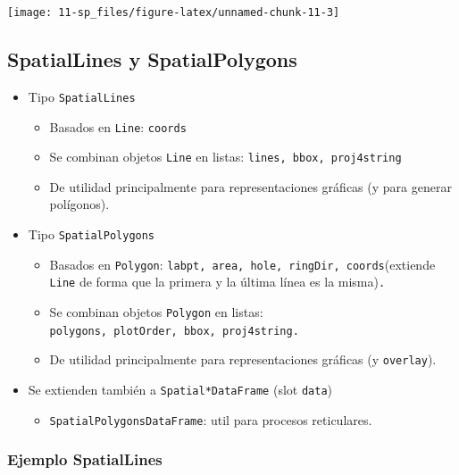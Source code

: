 \documentclass[
  spanish,
]{book}
\providecommand{\tightlist}{%
  \setlength{\itemsep}{0pt}\setlength{\parskip}{0pt}}
\theoremstyle{break}
\begin{document}
\begin{center}\texttt{[image: 11-sp\_files/figure-latex/unnamed-chunk-11-3]} \end{center}

\hypertarget{spatiallines-y-spatialpolygons}{%
\subsection{SpatialLines y SpatialPolygons}\label{spatiallines-y-spatialpolygons}}

\begin{itemize}
\item
  Tipo \texttt{SpatialLines}

  \begin{itemize}
  \item
    Basados en \texttt{Line}: \texttt{coords}
  \item
    Se combinan objetos \texttt{Line} en listas: \texttt{lines,\ bbox,\ proj4string}
  \item
    De utilidad principalmente para representaciones gráficas (y
    para generar polígonos).
  \end{itemize}
\item
  Tipo \texttt{SpatialPolygons}

  \begin{itemize}
  \item
    Basados en \texttt{Polygon}:
    \texttt{labpt,\ area,\ hole,\ ringDir,\ coords}(extiende \texttt{Line} de forma
    que la primera y la última línea es la misma)\texttt{.}
  \item
    Se combinan objetos \texttt{Polygon} en listas:
    \texttt{polygons,\ plotOrder,\ bbox,\ proj4string.}
  \item
    De utilidad principalmente para representaciones gráficas (y
    \texttt{overlay}).
  \end{itemize}
\item
  Se extienden también a \texttt{Spatial*DataFrame} (slot \texttt{data})

  \begin{itemize}
  \tightlist
  \item
    \texttt{SpatialPolygonsDataFrame}: util para procesos reticulares.
  \end{itemize}
\end{itemize}

\hypertarget{ejemplo-spatiallines}{%
\subsubsection{Ejemplo SpatialLines}\label{ejemplo-spatiallines}}
\end{document}
